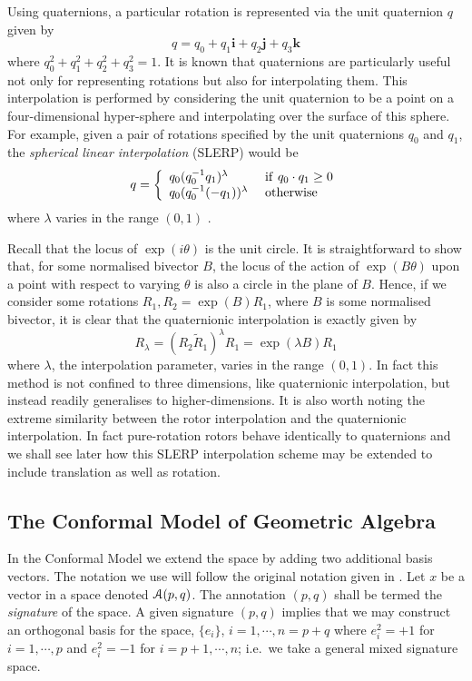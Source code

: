 Using quaternions, a particular rotation is represented via the unit quaternion 
$q$ given by
\[
q = q_0 + q_1 \mathbf{i} + q_2 \mathbf{j} + q_3 \mathbf{k}
\]
where $q_0^2 + q_1^2 + q_2^2 + q_3^2 = 1$. 
It is known\cite{ACM:325242} that quaternions are particularly useful
not only for representing rotations but also for interpolating them.
This interpolation is performed by considering the unit quaternion to
be a point on a four-dimensional hyper-sphere and interpolating over 
the surface of this sphere. For example, given a pair of rotations specified
by the
unit quaternions $q_0$ and $q_1$, the \emph{spherical linear interpolation} (SLERP)
would be
\[
q = \left\{
\begin{array}{ll}
q_0(q_0^{-1}q_1)^\lambda & {\rm ~if~} q_0 \cdot q_1 \ge 0 \\
q_0(q_0^{-1}(-q_1))^\lambda & {\rm ~otherwise}
\end{array}
\right.
\]
where $\lambda$ varies in the range $(0,1)$ \cite{slerp}.

Recall that the locus of $\exp(i\theta)$ is the unit
circle. It is straightforward to show that, for some normalised
bivector $B$, the locus of the action of $\exp(B\theta)$ upon a point with respect to varying
$\theta$ is also a circle in the plane of $B$. Hence, if we consider
some rotations $R_1, R_2 = \exp(B)R_1$, where 
$B$ is some normalised bivector, it is clear that
the quaternionic interpolation is exactly given by
\[
R_\lambda = (R_2 \tilde{R}_1)^\lambda R_1 = \exp(\lambda B) R_1
\]
where $\lambda$, the interpolation parameter, varies in the range $(0,1)$. 
In fact this method is not confined to three
dimensions, like quaternionic interpolation, but instead readily generalises
to higher-dimensions. It is also worth noting the extreme similarity between the
rotor interpolation and the quaternionic interpolation. In fact pure-rotation
rotors behave identically to quaternions and we shall see later how this SLERP
interpolation scheme may be extended to include translation as well as rotation.

\subsection{The Conformal Model of Geometric Algebra}

In the Conformal Model\cite{hestenes} we extend the space by adding two
additional basis vectors. The notation we use will follow the original
notation given in \cite{HS84}. Let $x$ be a vector in a space denoted
${\mathcal{A}}(p,q)$.  The annotation $(p,q)$ shall be termed the \emph{signature}
of the space.  A given signature $(p,q)$ implies that we may construct an
orthogonal basis for the space, $\{e_i\}$, $i=1,\cdots,n=p+q$ where $e_i^2=+1$
for $i=1,\cdots,p$ and $e_i^2=-1$ for $i=p+1,\cdots,n$; i.e.\ we take a
general mixed signature space.  

